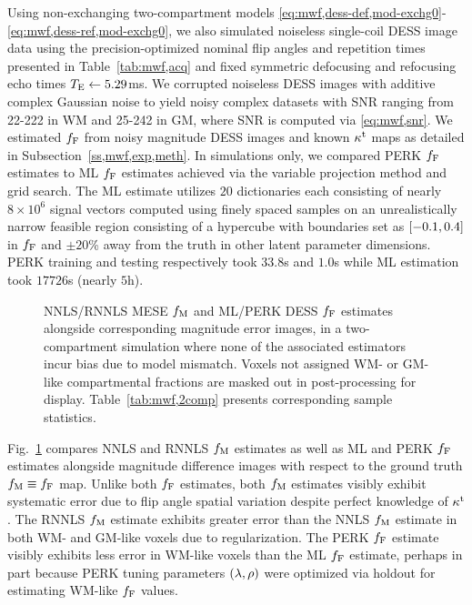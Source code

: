 Using non-exchanging two-compartment models 
\eqref{eq:mwf,dess-def,mod-exchg0}-\eqref{eq:mwf,dess-ref,mod-exchg0},
we also simulated noiseless single-coil DESS image data
using the precision-optimized nominal flip angles and repetition times
presented in Table~\ref{tab:mwf,acq}
and fixed symmetric defocusing and refocusing echo times $T_\mathrm{E} \gets 5.29$ms.
We corrupted noiseless DESS images
with additive complex Gaussian noise
to yield noisy complex datasets
with SNR ranging
from 22-222 in WM 
and 25-242 in GM,
where SNR is computed via \eqref{eq:mwf,snr}.
We estimated $f_{\mathrm{F}}$ 
from noisy magnitude DESS images
and known $\kappa^{\mathrm{t}}$ maps
as detailed in Subsection~\ref{ss,mwf,exp,meth}.
In simulations only,
we compared PERK $f_{\mathrm{F}}$ estimates
to ML $f_{\mathrm{F}}$ estimates
achieved via the variable projection method \cite{golub:03:snl}
and grid search.
The ML estimate utilizes $20$ dictionaries 
each consisting of nearly $8 \times 10^6$ signal vectors
computed using finely spaced samples
on an unrealistically narrow feasible region
consisting of a hypercube
with boundaries set 
as $\brac{-0.1,0.4}$ in $f_{\mathrm{F}}$ 
and $\pm 20$\% away from the truth
in other latent parameter dimensions.
PERK training and testing respectively took $33.8$s and $1.0$s
while ML estimation took $17726$s (nearly $5$h).

\begin{figure}[!t]
	\centering
	\hspace{0cm}
	\caption{%
		NNLS/RNNLS MESE $f_\mathrm{M}$ and ML/PERK DESS $f_{\mathrm{F}}$ estimates 
		alongside corresponding magnitude error images,
		in a two-compartment simulation
		where none of the associated estimators
		incur bias due to model mismatch.
		Voxels not assigned WM- or GM-like compartmental fractions
		are masked out in post-processing for display.
		Table~\ref{tab:mwf,2comp} presents corresponding sample statistics.
	}
	\label{fig:mwf,2comp}
\end{figure}

Fig.~\ref{fig:mwf,2comp} compares NNLS and RNNLS $f_\mathrm{M}$ estimates
as well as ML and PERK $f_{\mathrm{F}}$ estimates 
alongside magnitude difference images
with respect to the ground truth $f_\mathrm{M} \equiv f_{\mathrm{F}}$ map.
Unlike both $f_{\mathrm{F}}$ estimates,
both $f_\mathrm{M}$ estimates visibly exhibit systematic error
due to flip angle spatial variation
despite perfect knowledge of $\kappa^{\mathrm{t}}$.
The RNNLS $f_\mathrm{M}$ estimate exhibits greater error
than the NNLS $f_\mathrm{M}$ estimate
in both WM- and GM-like voxels
due to regularization.
The PERK $f_{\mathrm{F}}$ estimate visibly exhibits less error 
in WM-like voxels
than the ML $f_{\mathrm{F}}$ estimate,
perhaps in part because PERK tuning parameters $\paren{\lambda,\rho}$
were optimized via holdout 
for estimating WM-like $f_{\mathrm{F}}$ values.
  
